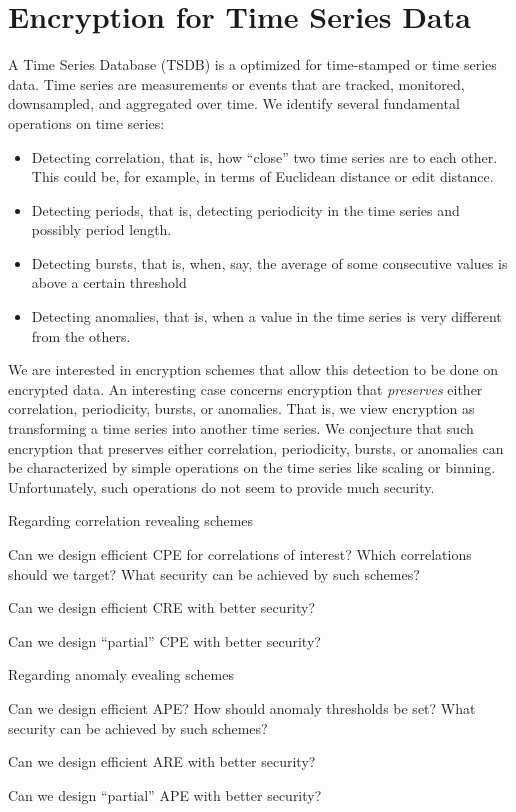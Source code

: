 \section{Encryption for Time Series Data}

A Time Series Database (TSDB) is a optimized for time-stamped or time series data. Time series are measurements or events that are tracked, monitored, downsampled, and aggregated over time.  We identify several fundamental operations on time series:
\begin{itemize}
\item Detecting correlation, that is, how ``close''  two time series are to each other.  This could be, for example, in terms of Euclidean distance or edit distance.
\item Detecting periods, that is, detecting periodicity in the time series and possibly period length.
\item Detecting bursts, that is, when, say, the average of some consecutive values is above a certain threshold
\item Detecting anomalies, that is, when a value in the time series is very different from the others.
\end{itemize}

We are interested in encryption schemes that allow this detection to be done on encrypted data.
An interesting case concerns encryption that \emph{preserves} either correlation, periodicity, bursts, or anomalies.  That is, we view encryption as transforming a time series into another time series.  We conjecture that such encryption that preserves either correlation, periodicity, bursts, or anomalies can be characterized by simple operations on the time series like scaling or binning.  Unfortunately, such operations do not seem to provide much security.  

Regarding correlation revealing schemes
\begin{question}
Can we design efficient CPE for correlations of interest?  Which correlations should we target?  What security can be achieved by such schemes?
\end{question}


\begin{question}
Can we design efficient CRE with better security?
\end{question}

\begin{question}
Can we design ``partial'' CPE with better security?
\end{question}


Regarding anomaly  evealing schemes
\begin{question}
Can we design efficient APE?  How should anomaly thresholds be set?  What security can be achieved by such schemes?
\end{question}


\begin{question}
Can we design efficient ARE with better security?
\end{question}

\begin{question}
Can we design ``partial'' APE with better security?
\end{question}

